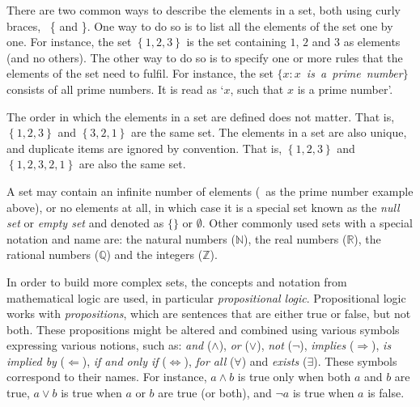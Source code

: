 There are two common ways to describe the elements in a set, both using curly braces, \ie\ \{ and \}.
One way to do so is to list all the elements of the set one by one.
For instance, the set \(\left\{ 1,2,3 \right\}\) is the set containing \(1\), \(2\) and \(3\) as elements (and no others).
The other way to do so is to specify one or more rules that the elements of the set need to fulfil.
For instance, the set \(\{ x : x\)~\emph{is~a~prime~number}\(\}\) consists of all prime numbers.
It is read as `\(x\), such that \(x\) is a prime number'.

The order in which the elements in a set are defined does not matter.
That is, \(\left\{ 1,2,3 \right\}\) and \(\left\{ 3,2,1 \right\}\) are the same set.
The elements in a set are also unique, and duplicate items are ignored by convention.
That is, \(\left\{ 1,2,3 \right\}\) and \(\left\{ 1,2,3,2,1 \right\}\) are also the same set.

A set may contain an infinite number of elements (\eg\ as the prime number example above), or no elements at all, in which case it is a special set known as the \emph{null set} or \emph{empty set} and denoted as \(\{ \}\) or \(\emptyset\).
Other commonly used sets with a special notation and name are: the natural numbers (\(\mathbb{N}\)), the real numbers (\(\mathbb{R}\)), the rational numbers (\(\mathbb{Q}\)) and the integers (\(\mathbb{Z}\)).

In order to build more complex sets, the concepts and notation from mathematical logic are used, in particular \emph{propositional logic}.
Propositional logic works with \emph{propositions}, which are sentences that are either true or false, but not both.
These propositions might be altered and combined using various symbols expressing various notions, such as: \emph{and} (\(\wedge\)), \emph{or} (\(\vee\)), \emph{not} (\(\neg\)), \emph{implies} (\(\Rightarrow\)), \emph{is implied by} (\(\Leftarrow\)), \emph{if and only if} (\(\Leftrightarrow\)), \emph{for all} (\(\forall\)) and \emph{exists} (\(\exists\)).
These symbols correspond to their names.
For instance, \(a \wedge b\) is true only when both \(a\) and \(b\) are true, \(a \vee b\) is true when \(a\) or \(b\) are true (or both), and \(\neg a\) is true when \(a\) is false.

